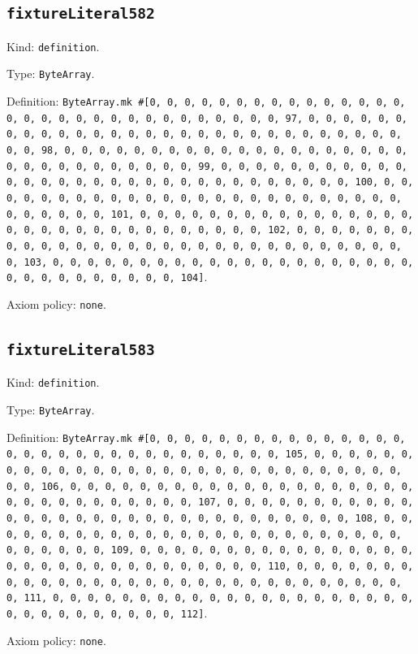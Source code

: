 \documentclass[11pt]{article}
\begin{document}
\subsection*{\texttt{fixtureLiteral582}}
\noindent Kind: \texttt{definition}.\par
\noindent Type: \texttt{ByteArray}.\par
\noindent Definition: \texttt{ByteArray.mk \#[0, 0, 0, 0, 0, 0, 0, 0, 0, 0, 0, 0, 0, 0, 0, 0, 0, 0, 0, 0, 0, 0, 0, 0, 0, 0, 0, 0, 0, 0, 0, 97, 0, 0, 0, 0, 0, 0, 0, 0, 0, 0, 0, 0, 0, 0, 0, 0, 0, 0, 0, 0, 0, 0, 0, 0, 0, 0, 0, 0, 0, 0, 0, 98, 0, 0, 0, 0, 0, 0, 0, 0, 0, 0, 0, 0, 0, 0, 0, 0, 0, 0, 0, 0, 0, 0, 0, 0, 0, 0, 0, 0, 0, 0, 0, 99, 0, 0, 0, 0, 0, 0, 0, 0, 0, 0, 0, 0, 0, 0, 0, 0, 0, 0, 0, 0, 0, 0, 0, 0, 0, 0, 0, 0, 0, 0, 0, 100, 0, 0, 0, 0, 0, 0, 0, 0, 0, 0, 0, 0, 0, 0, 0, 0, 0, 0, 0, 0, 0, 0, 0, 0, 0, 0, 0, 0, 0, 0, 0, 101, 0, 0, 0, 0, 0, 0, 0, 0, 0, 0, 0, 0, 0, 0, 0, 0, 0, 0, 0, 0, 0, 0, 0, 0, 0, 0, 0, 0, 0, 0, 0, 102, 0, 0, 0, 0, 0, 0, 0, 0, 0, 0, 0, 0, 0, 0, 0, 0, 0, 0, 0, 0, 0, 0, 0, 0, 0, 0, 0, 0, 0, 0, 0, 103, 0, 0, 0, 0, 0, 0, 0, 0, 0, 0, 0, 0, 0, 0, 0, 0, 0, 0, 0, 0, 0, 0, 0, 0, 0, 0, 0, 0, 0, 0, 0, 104]}.\par
\noindent Axiom policy: \texttt{none}.\par
\subsection*{\texttt{fixtureLiteral583}}
\noindent Kind: \texttt{definition}.\par
\noindent Type: \texttt{ByteArray}.\par
\noindent Definition: \texttt{ByteArray.mk \#[0, 0, 0, 0, 0, 0, 0, 0, 0, 0, 0, 0, 0, 0, 0, 0, 0, 0, 0, 0, 0, 0, 0, 0, 0, 0, 0, 0, 0, 0, 0, 105, 0, 0, 0, 0, 0, 0, 0, 0, 0, 0, 0, 0, 0, 0, 0, 0, 0, 0, 0, 0, 0, 0, 0, 0, 0, 0, 0, 0, 0, 0, 0, 106, 0, 0, 0, 0, 0, 0, 0, 0, 0, 0, 0, 0, 0, 0, 0, 0, 0, 0, 0, 0, 0, 0, 0, 0, 0, 0, 0, 0, 0, 0, 0, 107, 0, 0, 0, 0, 0, 0, 0, 0, 0, 0, 0, 0, 0, 0, 0, 0, 0, 0, 0, 0, 0, 0, 0, 0, 0, 0, 0, 0, 0, 0, 0, 108, 0, 0, 0, 0, 0, 0, 0, 0, 0, 0, 0, 0, 0, 0, 0, 0, 0, 0, 0, 0, 0, 0, 0, 0, 0, 0, 0, 0, 0, 0, 0, 109, 0, 0, 0, 0, 0, 0, 0, 0, 0, 0, 0, 0, 0, 0, 0, 0, 0, 0, 0, 0, 0, 0, 0, 0, 0, 0, 0, 0, 0, 0, 0, 110, 0, 0, 0, 0, 0, 0, 0, 0, 0, 0, 0, 0, 0, 0, 0, 0, 0, 0, 0, 0, 0, 0, 0, 0, 0, 0, 0, 0, 0, 0, 0, 111, 0, 0, 0, 0, 0, 0, 0, 0, 0, 0, 0, 0, 0, 0, 0, 0, 0, 0, 0, 0, 0, 0, 0, 0, 0, 0, 0, 0, 0, 0, 0, 112]}.\par
\noindent Axiom policy: \texttt{none}.\par
\end{document}
